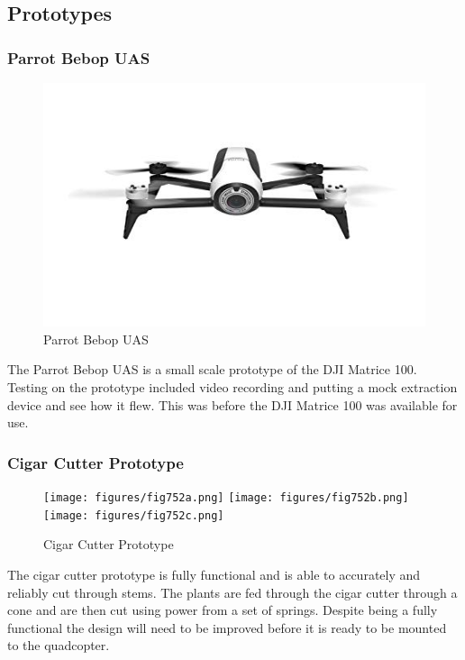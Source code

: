 \documentclass{wrcecapstone}
\begin{document}
\subsection{Prototypes}

\subsubsection{Parrot Bebop UAS}
\begin{figure}
\begin{center}
\includegraphics[width=0.3\columnwidth]{figures/fig751.png}
\end{center}
\caption{Parrot Bebop UAS \cite{parrot2019parrot}}
\label{fig:7.5.1}
\end{figure}
The Parrot Bebop UAS is a small scale prototype of the DJI Matrice 100. Testing on the prototype included video recording and putting a mock extraction device and see how it flew. This was before the DJI Matrice 100 was available for use. 

\subsubsection{Cigar Cutter Prototype}
\begin{figure}
\begin{center}
\texttt{[image: figures/fig752a.png]}
\texttt{[image: figures/fig752b.png]}
\texttt{[image: figures/fig752c.png]}
\end{center}
\caption{Cigar Cutter Prototype}
\label{fig:7.5.2}
\end{figure}
The cigar cutter prototype is fully functional and is able to accurately and reliably cut through stems. The plants are fed through the cigar cutter through a cone and are then cut using power from a set of springs.  Despite being a fully functional the design will need to be improved before it is ready to be mounted to the quadcopter.   
\end{document}
